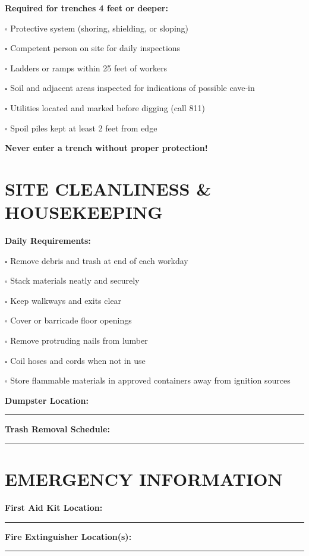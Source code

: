 \documentclass[11pt,letterpaper]{article}
\begin{document}
\textbf{Required for trenches 4 feet or deeper:}

$\square$ Protective system (shoring, shielding, or sloping)

$\square$ Competent person on site for daily inspections

$\square$ Ladders or ramps within 25 feet of workers

$\square$ Soil and adjacent areas inspected for indications of possible cave-in

$\square$ Utilities located and marked before digging (call 811)

$\square$ Spoil piles kept at least 2 feet from edge

\textbf{Never enter a trench without proper protection!}

\newpage

\section*{SITE CLEANLINESS \& HOUSEKEEPING}

\textbf{Daily Requirements:}

$\square$ Remove debris and trash at end of each workday

$\square$ Stack materials neatly and securely

$\square$ Keep walkways and exits clear

$\square$ Cover or barricade floor openings

$\square$ Remove protruding nails from lumber

$\square$ Coil hoses and cords when not in use

$\square$ Store flammable materials in approved containers away from ignition sources

\vspace{6pt}

\textbf{Dumpster Location:} \rule{7cm}{0.4pt}

\textbf{Trash Removal Schedule:} \rule{6cm}{0.4pt}

\vspace{12pt}

\section*{EMERGENCY INFORMATION}

\textbf{First Aid Kit Location:} \rule{8cm}{0.4pt}

\textbf{Fire Extinguisher Location(s):} \rule{7cm}{0.4pt}
\end{document}
